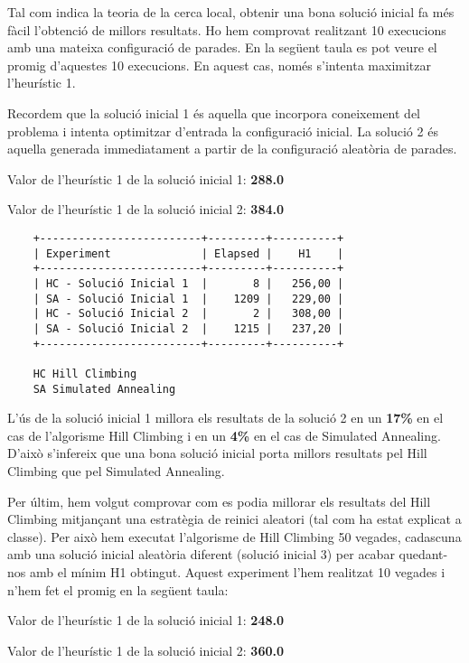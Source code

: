 
Tal com indica la teoria de la cerca local, obtenir una bona solució inicial fa més fàcil l'obtenció de millors resultats. Ho hem comprovat realitzant 10 execucions amb una mateixa configuració de parades. En la següent taula es pot veure el promig d'aquestes 10 execucions. En aquest cas, només s'intenta maximitzar l'heurístic 1.

Recordem que la solució inicial 1 és aquella que incorpora coneixement del problema i intenta optimitzar d'entrada la configuració inicial. La solució 2 és aquella generada immediatament a partir de la configuració aleatòria de parades.

Valor de l'heurístic 1 de la solució inicial 1: \textbf{288.0}

Valor de l'heurístic 1 de la solució inicial 2: \textbf{384.0}

\begin{verbatim}
	+-------------------------+---------+----------+
	| Experiment              | Elapsed |    H1    |
	+-------------------------+---------+----------+
	| HC - Solució Inicial 1  |       8 |   256,00 |
	| SA - Solució Inicial 1  |    1209 |   229,00 |
	| HC - Solució Inicial 2  |       2 |   308,00 |
	| SA - Solució Inicial 2  |    1215 |   237,20 |
	+-------------------------+---------+----------+
	
	HC Hill Climbing
	SA Simulated Annealing
\end{verbatim}
		
L'ús de la solució inicial 1 millora els resultats de la solució 2 en un \textbf{17\%} en el cas de l'algorisme Hill Climbing i en un \textbf{4\%} en el cas de Simulated Annealing. D'això s'infereix que una bona solució inicial porta millors resultats pel Hill Climbing que pel Simulated Annealing.

Per últim, hem volgut comprovar com es podia millorar els resultats del Hill Climbing mitjançant una estratègia de reinici aleatori (tal com ha estat explicat a classe). Per això hem executat l'algorisme de Hill Climbing 50 vegades, cadascuna amb una solució inicial aleatòria diferent (solució inicial 3) per acabar quedant-nos amb el mínim H1 obtingut. Aquest experiment l'hem realitzat 10 vegades i n'hem fet el promig en la següent taula:

Valor de l'heurístic 1 de la solució inicial 1: \textbf{248.0}

Valor de l'heurístic 1 de la solució inicial 2: \textbf{360.0}

